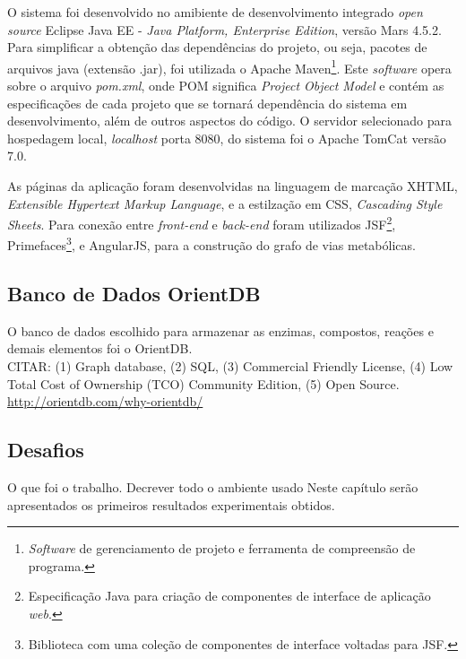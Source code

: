 \indent O sistema foi desenvolvido no amibiente de desenvolvimento integrado \textit{open source} Eclipse Java EE - \textit{Java Platform, Enterprise Edition}, versão Mars 4.5.2. Para simplificar a obtenção das dependências do projeto, ou seja, pacotes de arquivos java (extensão .jar), foi utilizada o Apache Maven\footnote{\textit{Software} de gerenciamento de projeto e ferramenta de compreensão de programa.}. Este \textit{software} opera sobre o arquivo \textit{pom.xml}, onde POM significa \textit{Project Object Model} e contém as especificações de cada projeto que se tornará dependência do sistema em desenvolvimento, além de outros aspectos do código. O servidor selecionado para hospedagem local, \textit{localhost} porta 8080, do sistema foi o Apache TomCat versão 7.0.

\indent As páginas da aplicação foram desenvolvidas na linguagem de marcação XHTML, \textit{Extensible Hypertext Markup Language}, e a estilzação em CSS, \textit{Cascading Style Sheets}. Para conexão entre \textit{front-end} e \textit{back-end} foram utilizados JSF\footnote{Especificação Java para criação de componentes de interface de aplicação \textit{web}.}, Primefaces\footnote{Biblioteca com uma coleção de componentes de interface voltadas para JSF.}, e AngularJS, para a construção do grafo de vias metabólicas.

\subsection{Banco de Dados OrientDB}

\indent O banco de dados escolhido para armazenar as enzimas, compostos, reações e demais elementos foi o OrientDB.\\
CITAR: (1) Graph database, (2) SQL, (3) Commercial Friendly License, (4) Low Total Cost of Ownership (TCO) Community Edition, (5) Open Source. \url{http://orientdb.com/why-orientdb/}

\subsection{Desafios}
 

O que foi o trabalho. 
Decrever todo o ambiente usado
Neste capítulo serão apresentados os primeiros resultados experimentais obtidos.
